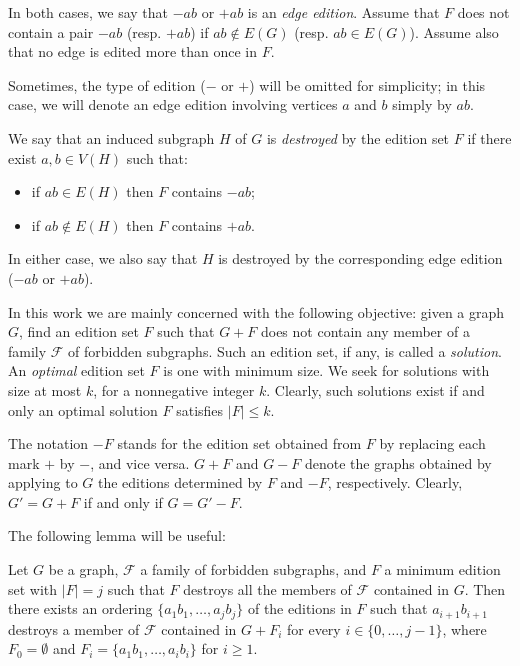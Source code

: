 \documentclass[12pt]{article}
\begin{document}
In both cases, we say that $-ab$ or $+ab$ is an {\em edge edition}.
Assume that $F$ does not contain a pair $-ab$ (resp. $+ab$) if $ab \notin E(G)$ (resp. $ab \in E(G)$).
Assume also that no edge is edited more than once in $F$.

Sometimes, the type of edition ($-$ or $+$) will be omitted for simplicity; in this case,
we will denote an edge edition involving vertices $a$ and $b$ simply by $ab$.

We say that an induced subgraph $H$ of $G$ is {\em destroyed} by the edition
set $F$ if there exist $a,b \in V(H)$ such that:

\begin{itemize}

\item  if $ab \in E(H)$ then $F$ contains $-ab$;

\item  if $ab \notin E(H)$ then $F$ contains $+ab$.

\end{itemize}

In either case, we also say that $H$ is destroyed by the corresponding edge edition ($-ab$ or $+ab$).

In this work we are mainly concerned with the following objective: given a graph $G$,
find an edition set $F$ such that $G+F$ does not contain
any member of a family ${\mathscr F}$ of forbidden subgraphs. Such an edition set, if any, is called a {\em solution}.
An {\em optimal} edition set $F$ is one with minimum size. We seek for solutions with size at most $k$,
for a nonnegative integer $k$. Clearly, such solutions exist if and only an optimal solution $F$ satisfies $|F| \leq k$.

The notation $-F$ stands for the edition set obtained from
$F$ by replacing each mark $+$ by $-$, and vice versa. $G+F$ and
$G-F$ denote the graphs obtained by applying to $G$ the editions
determined by $F$ and $-F$, respectively. Clearly, $G'=G+F$ if and
only if $G=G'-F$.

The following lemma will be useful:

\begin{lema} \label{orderF}
Let $G$ be a graph, ${\mathscr F}$ a family of forbidden subgraphs, and $F$ a minimum edition set with $|F|=j$ such that $F$ destroys all the members of ${\mathscr F}$ contained in $G$. Then there exists an ordering $\{a_1b_1, \ldots, a_jb_j\}$ of the editions in $F$ such that $a_{i+1}b_{i+1}$ destroys a member of ${\mathscr F}$ contained in $G + F_i$ for every $i \in \{0,\ldots,  j-1\}$, where $F_0=\emptyset$ and $F_i = \{a_1b_1, \ldots, a_ib_i\}$ for $i\geq 1$.
\end{lema}
\end{document}
